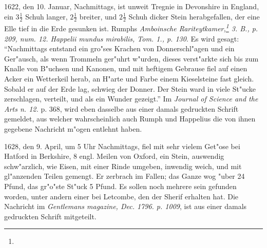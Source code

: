 \documentclass[a4paper, 11pt, oneside, polutonikogreek, german]{article}
\begin{document}
1622, den 10. Januar, Nachmittags, ist unweit Tregnie in Devonshire in England, ein $\mathfrak{3\frac{1}{2}}$ Schuh langer, $\mathfrak{2\frac{1}{2}}$ breiter, und $\mathfrak{2\frac{1}{2}}$ Schuh dicker Stein herabgefallen, der eine Elle tief in die Erde gesunken ist. Rumphs \emph{Amboinsche Rariteytkamer,\footnote{} 3. B., p. 209, num. 12. Happelii mundus mirabilis, Tom. 1., p. 130}. Es wird gesagt: "`Nachmittags entstand ein gro"ses Krachen von Donnerschl"agen und ein Ger"ausch, als wenn Trommeln ger"uhrt w"urden, dieses verst"arkte sich bis zum Knalle von B"uchsen und Kanonen, und mit heftigem Gebrause fiel auf einen Acker ein Wetterkeil herab, an H"arte und Farbe einem Kieselsteine fast gleich. Sobald er auf der Erde lag, schwieg der Donner. Der Stein ward in viele St"ucke zerschlagen, verteilt, und als ein Wunder gezeigt."' Im \emph{Journal of Science and the Arts n. 12.} p. 368, wird eben dasselbe aus einer damals gedruckten Schrift gemeldet, aus welcher wahrscheinlich auch Rumph und Happelius die von ihnen gegebene Nachricht m"ogen entlehnt haben.

1628, den 9. April, um 5 Uhr Nachmittags, fiel mit sehr vielem Get"ose bei Hatford in Berkshire, 8 engl. Meilen von Oxford, ein Stein, auswendig schw"arzlich, wie Eisen, mit einer Rinde umgeben, inwendig weich, und mit gl"anzenden Teilen gemengt. Er zerbrach im Fallen; das Ganze wog "uber 24 Pfund, das gr"o"ste St"uck 5 Pfund. Es sollen noch mehrere sein gefunden worden, unter andern einer bei Letcombe, den der Sherif erhalten hat. Die Nachricht im \emph{Gentlemans magazine, Dec. 1796. p. 1009}, ist aus einer damals gedruckten Schrift mitgeteilt.
\end{document}
